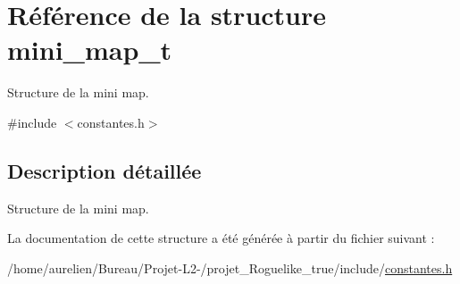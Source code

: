 \hypertarget{structmini__map__t}{}\section{Référence de la structure mini\+\_\+map\+\_\+t}
\label{structmini__map__t}


Structure de la mini map.  




{\ttfamily \#include $<$constantes.\+h$>$}



\subsection{Description détaillée}
Structure de la mini map. 

La documentation de cette structure a été générée à partir du fichier suivant \+:\begin{DoxyCompactItemize}
\item 
/home/aurelien/\+Bureau/\+Projet-\/\+L2-\//projet\+\_\+\+Roguelike\+\_\+true/include/\hyperlink{constantes_8h}{constantes.\+h}\end{DoxyCompactItemize}
